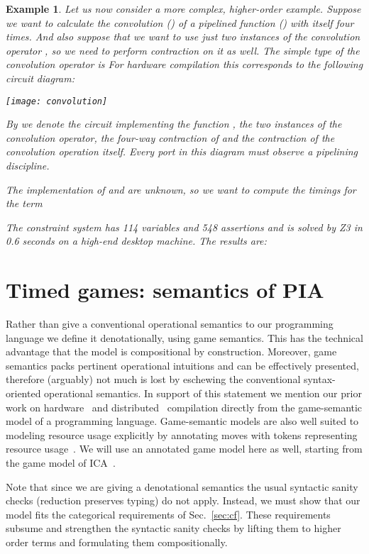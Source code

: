 \documentclass{article}
\newtheorem{example}[theorem]{Example}
\begin{document}
\begin{example}\label{ex:fx4}
Let us now consider a more complex, higher-order example. Suppose we want to calculate the convolution () of a pipelined function () with itself four times. And also suppose that we want to use just two instances of the convolution operator , so we need to perform contraction on it as well. The simple type of the convolution operator is
 For hardware compilation this corresponds to the following circuit diagram:
\begin{center}
\texttt{[image: convolution]}
\end{center}
By  we denote the circuit implementing the function ,  the two instances of the convolution operator,  the four-way contraction of  and  the contraction of the convolution operation itself. Every port in this diagram must observe a pipelining discipline. 

The implementation of  and  are unknown, so we want to compute the timings for the term

The constraint system has 114 variables and 548 assertions and is solved by Z3 in 0.6 seconds on a high-end desktop machine. The results are:

\end{example}

\section{Timed games: semantics of PIA}\label{sec:gamhort}
Rather than give a conventional operational semantics to our programming language we define it denotationally, using game semantics. This has the technical advantage that the model is compositional by construction. Moreover, game semantics packs pertinent operational intuitions and can be effectively presented, therefore (arguably) not much is lost by eschewing the conventional syntax-oriented operational semantics. In support of this statement we mention our prior work on hardware~\cite{DBLP:conf/mpc/Ghica12} and distributed~\cite{fredrikssong13} compilation directly from the game-semantic model of a programming language. 
Game-semantic models are also well suited to modeling resource usage
explicitly by annotating moves with tokens representing resource
usage~\cite{DBLP:conf/popl/Ghica05}. We will use an annotated game
model here as well, starting from the game model of
ICA~\cite{DBLP:journals/apal/GhicaM08}. 

Note that since we are giving a denotational semantics the usual syntactic sanity checks (reduction preserves typing) do not apply. Instead, we must show that our model fits the categorical requirements of Sec.~\ref{sec:cf}. These requirements subsume and strengthen the syntactic sanity checks by lifting them to higher order terms and formulating them compositionally. 
\end{document}
